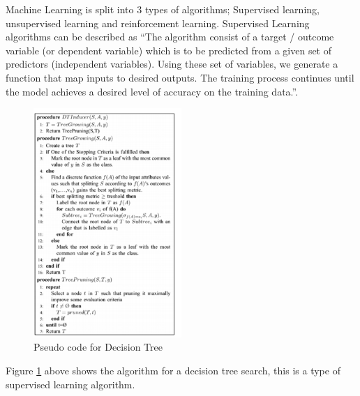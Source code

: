 \documentclass[10pt,a4paper]{scrartcl}
\begin{document}
\begin{multicols}{2}
		Machine Learning is split into 3 types of algorithms; Supervised learning, unsupervised learning and reinforcement learning. Supervised Learning algorithms can be described as ``The algorithm consist of a target / outcome variable (or dependent variable) which is to be predicted from a given set of predictors (independent variables). Using these set of variables, we generate a function that map inputs to desired outputs. The training process continues until the model achieves a desired level of accuracy on the training data.''\cite{EssentialMachineLearningAlgorithms}.
\begin{figure}[H]
	\begin{center}
	\includegraphics[width=0.5\textwidth,inner] {pseudocodeDecisionTree.png}
	\caption{Pseudo code for Decision Tree \cite{MachineLearningAlgorithmsReview}}
	\label{DecisionTreePseudoCode}
	\end{center}
\end{figure}
Figure \ref{DecisionTreePseudoCode}	above shows the algorithm for a decision tree search, this is a type of supervised learning algorithm.	


\end{multicols}
\end{document}
